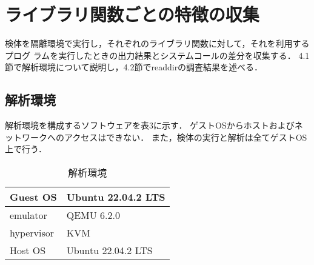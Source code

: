\documentclass[submit,techreq,noauthor]{eco}	%
\begin{document}
\section{ライブラリ関数ごとの特徴の収集}
検体を隔離環境で実行し，それぞれのライブラリ関数に対して，それを利用するプログ
ラムを実行したときの出力結果とシステムコールの差分を収集する．
\indent
4.1節で解析環境について説明し，4.2節でreaddirの調査結果を述べる．

\subsection{解析環境}
解析環境を構成するソフトウェアを表3に示す．
ゲストOSからホストおよびネットワークへのアクセスはできない．
また，検体の実行と解析は全てゲストOS上で行う．

\begin{table}[t]
  \caption{解析環境}
  \label{table: 解析環境}
  \centering
  \begin{tabular}{|l|l|}
  \hline
  Guest OS   & Ubuntu 22.04.2 LTS \\ \hline
  emulator   & QEMU 6.2.0         \\ \hline
  hypervisor & KVM                \\ \hline
  Host OS    & Ubuntu 22.04.2 LTS \\ \hline
  \end{tabular}
\end{table}
\end{document}
